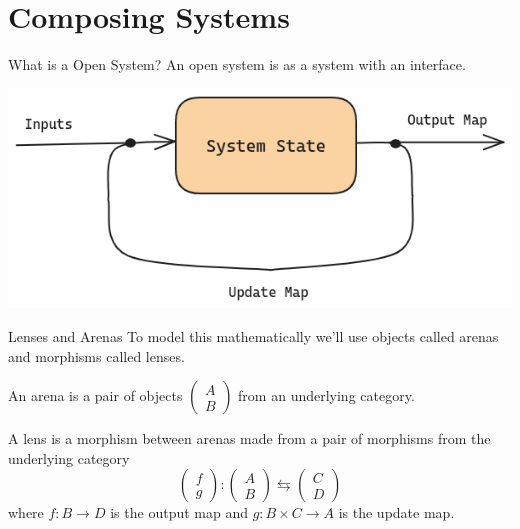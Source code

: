 \documentclass{beamer}
\begin{document}
\section{Composing Systems}
\begin{frame}{What is a Open System?}
    An open system is as a system with an interface.

    \vspace*{0.125in}
    \begin{center}
        \includegraphics[scale=0.35]{system_diagram_open.png}
    \end{center}
\end{frame}


\begin{frame}{Lenses and Arenas}
    To model this mathematically we'll use objects called arenas and morphisms called lenses.

    \vspace*{0.125in}
    \begin{definition}[Arenas]
        An arena is a pair of objects $\begin{pmatrix}A \\ B\end{pmatrix}$ from an underlying category.
    \end{definition}

    \begin{definition}
        A lens is a morphism between arenas made from a pair of morphisms from the underlying category
        $$\begin{pmatrix}f \\ g\end{pmatrix}: \begin{pmatrix}A \\ B\end{pmatrix} \leftrightarrows \begin{pmatrix}C \\ D\end{pmatrix}$$
        where $f:B\rightarrow D$ is the output map and $g:B\times C \rightarrow A$ is the update map.
    \end{definition}
\end{frame}
\end{document}
